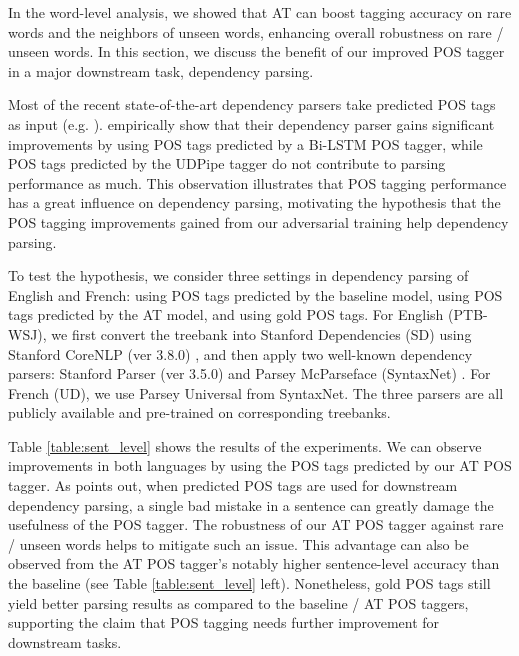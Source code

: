 \documentclass[11pt,a4paper]{article}
\begin{document}
In the word-level analysis, we showed that AT can boost tagging accuracy on rare words and the neighbors of unseen words, enhancing overall robustness on rare \!/\! unseen words. 
In this section, we discuss the benefit of our improved POS tagger in a major downstream task, dependency parsing.

Most of the recent state-of-the-art dependency parsers take predicted POS tags as input (e.g. ).
 empirically show that their
dependency parser gains significant improvements by using POS tags predicted by a Bi-LSTM POS tagger, while POS tags predicted by the UDPipe tagger \cite{Straka2016UDPipeTP} do not contribute to parsing performance as much.
This observation illustrates that POS tagging performance has a great influence on dependency parsing, motivating the hypothesis that the POS tagging improvements gained from our adversarial training help dependency parsing.

To test the hypothesis, we consider three settings in dependency parsing of English and French: using POS tags predicted by the baseline model, using POS tags predicted by the AT model, and using gold POS tags. 
For English (PTB-WSJ), we first convert the treebank into Stanford Dependencies (SD) using Stanford CoreNLP (ver 3.8.0) \cite{manning-EtAl:2014:P14-5}, and then apply two well-known dependency parsers:
Stanford Parser (ver 3.5.0) \cite{chen2014fast} and Parsey McParseface (SyntaxNet) \cite{andor2016globally}.
For French (UD),
we use Parsey Universal from SyntaxNet.
The three parsers are all publicly available and pre-trained on corresponding treebanks.

Table \ref{table:sent_level} shows the results of the experiments. We can observe improvements in both languages by using the POS tags predicted by our AT POS tagger. 
As  points out, when predicted POS tags are used for downstream dependency parsing, a single bad mistake in a sentence can greatly damage the usefulness of the POS tagger.
The robustness of our AT POS tagger against rare \!/\! unseen words helps to mitigate such an issue.
This advantage can also be observed from the AT POS tagger's notably higher sentence-level accuracy than the baseline (see Table \ref{table:sent_level} left).
Nonetheless, gold POS tags still yield better parsing results as compared to the baseline \!/\! AT POS taggers, supporting the claim that POS tagging needs further improvement for downstream tasks.
\end{document}
